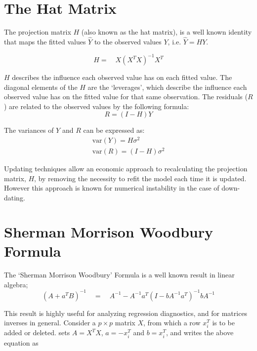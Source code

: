 \documentclass[12pt, a4paper]{article}
\begin{document}
\section{The Hat Matrix} %


The projection matrix $H$ (also known as the hat matrix), is a
well known identity that maps the fitted values $\hat{Y}$ to the
observed values $Y$, i.e. $\hat{Y} = HY$.


\begin{equation}
H =\quad X(X^{T}X)^{-1}X^{T}
\end{equation}


$H$ describes the influence each observed value has on each fitted
value. The diagonal elements of the $H$ are the `leverages', which
describe the influence each observed value has on the fitted value
for that same observation. The residuals ($R$) are related to the
observed values by the following formula:
\begin{equation}
R = (I-H)Y
\end{equation}


The variances of $Y$ and $R$ can be expressed as:
\begin{eqnarray}
\mbox{var}(Y) = H\sigma^{2} \nonumber\\
\mbox{var}(R) = (I-H)\sigma^{2}
\end{eqnarray}


Updating techniques allow an economic approach to recalculating
the projection matrix, $H$, by removing the necessity to refit the
model each time it is updated. However this approach is known for
numerical instability in the case of down-dating.


\section{Sherman Morrison Woodbury Formula} %


The `Sherman Morrison Woodbury' Formula is a well known result in
linear algebra;
\begin{equation}
(A+a^{T}B)^{-1} \quad = \quad A^{-1}-
A^{-1}a^{T}(I-bA^{-1}a^{T})^{-1}bA^{-1}
\end{equation}


This result is highly useful for analyzing regression diagnostics,
and for matrices inverses in general. Consider a $p \times p$
matrix $X$, from which a row $x_{i}^{T}$ is to be added or
deleted. \citet{CookWeisberg} sets $A = X^{T}X$, $a=-x_{i}^{T}$
and $b=x_{i}^{T}$, and writes the above equation as
\end{document}
